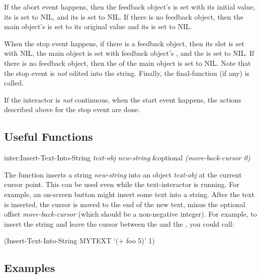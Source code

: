 If the abort event happens, then the feedback object's  is set with
its initial value, its  is set to NIL, and its
 is set to NIL.  If there is no feedback object, then the main
object's  is set to its original value and its
 is set to NIL.

When the stop event happens, if there is a feedback object, then its
 slot is set with NIL, the main object is set with
feedback object's , and the  is set to NIL.
If there is no feedback object, then the  of the main
object is set to NIL.  Note that the stop event is {\it not} edited into the
string.  Finally, the final-function (if any) is called.

If the interactor is {\it not} continuous, when the start event happens, the
actions described above for the stop event are done.


\subsection{Useful Functions}

\begin{programexample}
inter:Insert-Text-Into-String {\it text-obj} {\it new-string} \&optional {\it (move-back-cursor 0)}\value{function}
\end{programexample}
The function  inserts a string {\it new-string} into
an  object {\it text-obj} at the current cursor point.  This can
be used even while the text-interactor is
running.  For example, an on-screen button might insert some text into a
string.  After the text is inserted, the cursor is moved to the end of the
new text, minus the optional offset {\it move-back-cursor} (which should be
a non-negative integer).  For example, to insert the string  and leave the cursor between the  and the , you could call:
\begin{programexample}
(Insert-Text-Into-String MYTEXT `(+ foo 5)' 1)
\end{programexample}


\subsection{Examples}

